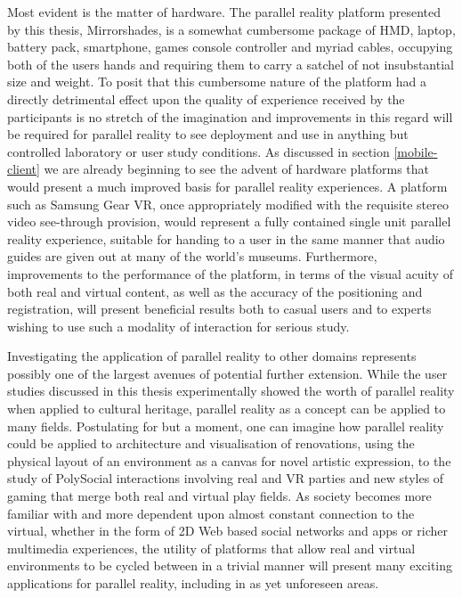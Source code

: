 Most evident is the matter of hardware. The parallel reality platform presented by this thesis, Mirrorshades, is a somewhat cumbersome package of HMD, laptop, battery pack, smartphone, games console controller and myriad cables, occupying both of the users hands and requiring them to carry a satchel of not insubstantial size and weight. To posit that this cumbersome nature of the platform had a directly detrimental effect upon the quality of experience received by the participants is no stretch of the imagination and improvements in this regard will be required for parallel reality to see deployment and use in anything but controlled laboratory or user study conditions. As discussed in section \ref{mobile-client} we are already beginning to see the advent of hardware platforms that would present a much improved basis for parallel reality experiences. A platform such as Samsung Gear VR, once appropriately modified with the requisite stereo video see-through provision, would represent a fully contained single unit parallel reality experience, suitable for handing to a user in the same manner that audio guides are given out at many of the world's museums. Furthermore, improvements to the performance of the platform, in terms of the visual acuity of both real and virtual content, as well as the accuracy of the positioning and registration, will present beneficial results both to casual users and to experts wishing to use such a modality of interaction for serious study.

Investigating the application of parallel reality to other domains represents possibly one of the largest avenues of potential further extension. While the user studies discussed in this thesis experimentally showed the worth of parallel reality when applied to cultural heritage, parallel reality as a concept can be applied to many fields. Postulating for but a moment, one can imagine how parallel reality could be applied to architecture and visualisation of renovations, using the physical layout of an environment as a canvas for novel artistic expression, to the study of PolySocial interactions involving real and VR parties and new styles of gaming that merge both real and virtual play fields. As society becomes more familiar with and more dependent upon almost constant connection to the virtual, whether in the form of 2D Web based social networks and apps or richer multimedia experiences, the utility of platforms that allow real and virtual environments to be cycled between in a trivial manner will present many exciting applications for parallel reality, including in as yet unforeseen areas.

